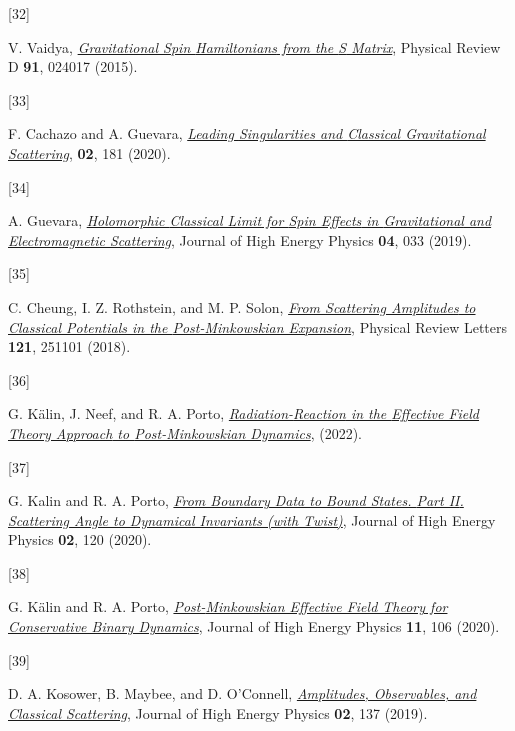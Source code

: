 \documentclass[
  10pt,
  a4paper,
  DIV=11,
  numbers=noendperiod,
  twoside]{scrreprt}
\newlength{\cslhangindent}
\newlength{\csllabelwidth}
\newlength{\cslentryspacingunit} %
\newenvironment{CSLReferences}[2] %
 {%
  \setlength{\parindent}{0pt}
  \ifodd #1
  \let\oldpar\par
  \def\par{\hangindent=\cslhangindent\oldpar}
  \fi
  \setlength{\parskip}{#2\cslentryspacingunit}
 }%
 {}
\newcommand{\CSLLeftMargin}[1]{\parbox[t]{\csllabelwidth}{#1}}
\newcommand{\CSLRightInline}[1]{\parbox[t]{\linewidth - \csllabelwidth}{#1}\break}
\DeclareRobustCommand{\[}{\begin{equation}}
\DeclareRobustCommand{\]}{\end{equation}}
\begin{document}
\begin{CSLReferences}{0}{0}
\leavevmode{}%
\CSLLeftMargin{{[}32{]} }%
\CSLRightInline{V. Vaidya,
\emph{\href{https://doi.org/10.1103/PhysRevD.91.024017}{Gravitational
Spin {Hamiltonians} from the {S} Matrix}}, Physical Review D
\textbf{91}, 024017 (2015).}

\leavevmode{}%
\CSLLeftMargin{{[}33{]} }%
\CSLRightInline{F. Cachazo and A. Guevara,
\emph{\href{https://doi.org/10.1007/JHEP02(2020)181}{Leading
{Singularities} and {Classical Gravitational Scattering}}}, \textbf{02},
181 (2020).}

\leavevmode{}%
\CSLLeftMargin{{[}34{]} }%
\CSLRightInline{A. Guevara,
\emph{\href{https://doi.org/10.1007/JHEP04(2019)033}{Holomorphic
{Classical Limit} for {Spin Effects} in {Gravitational} and
{Electromagnetic Scattering}}}, Journal of High Energy Physics
\textbf{04}, 033 (2019).}

\leavevmode{}%
\CSLLeftMargin{{[}35{]} }%
\CSLRightInline{C. Cheung, I. Z. Rothstein, and M. P. Solon,
\emph{\href{https://doi.org/10.1103/PhysRevLett.121.251101}{From
{Scattering Amplitudes} to {Classical Potentials} in the
{Post-Minkowskian Expansion}}}, Physical Review Letters \textbf{121},
251101 (2018).}

\leavevmode{}%
\CSLLeftMargin{{[}36{]} }%
\CSLRightInline{G. Kälin, J. Neef, and R. A. Porto,
\emph{\href{https://arxiv.org/abs/2207.00580}{Radiation-{Reaction} in
the {Effective Field Theory Approach} to {Post-Minkowskian Dynamics}}},
(2022).}

\leavevmode{}%
\CSLLeftMargin{{[}37{]} }%
\CSLRightInline{G. Kalin and R. A. Porto,
\emph{\href{https://doi.org/10.1007/JHEP02(2020)120}{From Boundary Data
to Bound States. {Part II}. {Scattering} Angle to Dynamical Invariants
(with Twist)}}, Journal of High Energy Physics \textbf{02}, 120 (2020).}

\leavevmode{}%
\CSLLeftMargin{{[}38{]} }%
\CSLRightInline{G. Kälin and R. A. Porto,
\emph{\href{https://doi.org/10.1007/JHEP11(2020)106}{Post-{Minkowskian
Effective Field Theory} for {Conservative Binary Dynamics}}}, Journal of
High Energy Physics \textbf{11}, 106 (2020).}

\leavevmode{}%
\CSLLeftMargin{{[}39{]} }%
\CSLRightInline{D. A. Kosower, B. Maybee, and D. O'Connell,
\emph{\href{https://doi.org/10.1007/JHEP02(2019)137}{Amplitudes,
Observables, and Classical Scattering}}, Journal of High Energy Physics
\textbf{02}, 137 (2019).}


\end{CSLReferences}
\end{document}
